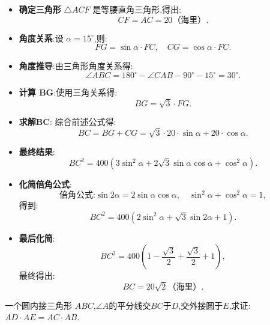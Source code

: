 \begin{questions}
\begin{solution}
		\begin{itemize}
			\item \textbf{确定三角形} $\triangle{ACF}$ 是等腰直角三角形,得出:
			      \[
				      CF = AC = 20 \text{（海里）}.
			      \]
			\item \textbf{角度关系}:设 $\alpha = 15^\circ$,则:
			      \[
				      FG = \sin{\alpha} \cdot FC, \quad CG = \cos{\alpha} \cdot FC.
			      \]
			\item \textbf{角度推导}:由三角形角度关系得:
			      \[
				      \angle ABC = 180^\circ - \angle CAB - 90^\circ - 15^\circ = 30^\circ.
			      \]
			\item \textbf{计算 BG}:使用三角关系得:
			      \[
				      BG = \sqrt{3} \cdot FG.
			      \]
			\item \textbf{求解BC}: 综合前述公式得:
			      \[
				      BC = BG + CG = \sqrt{3} \cdot 20 \cdot \sin{\alpha} + 20 \cdot \cos{\alpha}.
			      \]
			\item \textbf{最终结果}:
			      \[
				      BC^2 = 400 \left( 3 \sin^2{\alpha} + 2\sqrt{3} \sin{\alpha} \cos{\alpha} + \cos^2{\alpha} \right).
			      \]
			\item \textbf{化简倍角公式}:
			      \[
				      \text{倍角公式:} \sin{2\alpha} = 2 \sin{\alpha} \cos{\alpha}, \quad \sin^2{\alpha} + \cos^2{\alpha} = 1,
			      \]
			      得到:
			      \[
				      BC^2 = 400 \left( 2 \sin^2{\alpha} + \sqrt{3} \sin{2\alpha} + 1 \right).
			      \]
			\item \textbf{最后化简}:
			      \[
				      BC^2 = 400 \left( 1 - \frac{\sqrt{3}}{2} + \frac{\sqrt{3}}{2} + 1 \right),
			      \]
			      最终得出:
			      \[
				      BC = 20\sqrt{2} \text{（海里）}.
			      \]
		\end{itemize}
	\end{solution}

	\question 一个圆内接三角形 \( ABC \),$\angle A$的平分线交$BC$于$D$,交外接圆于$E$,求证: \( AD \cdot AE = AC \cdot
	AB\).

	\begin{solution}

		\begin{minipage}{.4\textwidth}
\end{minipage}
\end{solution}
\end{questions}

